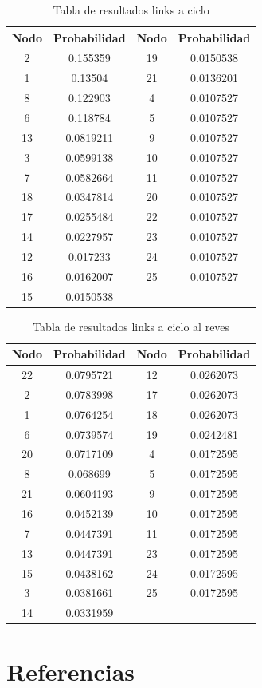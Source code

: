 \begin{table}[H]
\centering
	\begin{tabular}{|c|c|c|c|}
		\hline
		Nodo & Probabilidad & Nodo & Probabilidad \\ \hline
		2    & 0.155359     & 19   & 0.0150538    \\
		1    & 0.13504      & 21   & 0.0136201    \\
		8    & 0.122903     & 4    & 0.0107527    \\
		6    & 0.118784     & 5    & 0.0107527    \\
		13   & 0.0819211    & 9    & 0.0107527    \\
		3    & 0.0599138    & 10   & 0.0107527    \\
		7    & 0.0582664    & 11   & 0.0107527    \\
		18   & 0.0347814    & 20   & 0.0107527    \\
		17   & 0.0255484    & 22   & 0.0107527    \\
		14   & 0.0227957    & 23   & 0.0107527    \\
		12   & 0.017233     & 24   & 0.0107527    \\
		16   & 0.0162007    & 25   & 0.0107527    \\
		15   & 0.0150538    & ~    & ~            \\ \hline
	\end{tabular}
\caption{Tabla de resultados links a ciclo}
\end{table}

\begin{table}[H]
\centering
	\begin{tabular}{|c|c|c|c|}
		\hline
		Nodo & Probabilidad & Nodo & Probabilidad \\ \hline
		22   & 0.0795721    & 12   & 0.0262073    \\
		2    & 0.0783998    & 17   & 0.0262073    \\
		1    & 0.0764254    & 18   & 0.0262073    \\
		6    & 0.0739574    & 19   & 0.0242481    \\
		20   & 0.0717109    & 4    & 0.0172595    \\
		8    & 0.068699     & 5    & 0.0172595    \\
		21   & 0.0604193    & 9    & 0.0172595    \\
		16   & 0.0452139    & 10   & 0.0172595    \\
		7    & 0.0447391    & 11   & 0.0172595    \\
		13   & 0.0447391    & 23   & 0.0172595    \\
		15   & 0.0438162    & 24   & 0.0172595    \\
		3    & 0.0381661    & 25   & 0.0172595    \\
		14   & 0.0331959    & ~    & ~            \\ \hline
	\end{tabular}
\caption{Tabla de resultados links a ciclo al reves}
\end{table}


\section{Referencias}


\newpage
%

